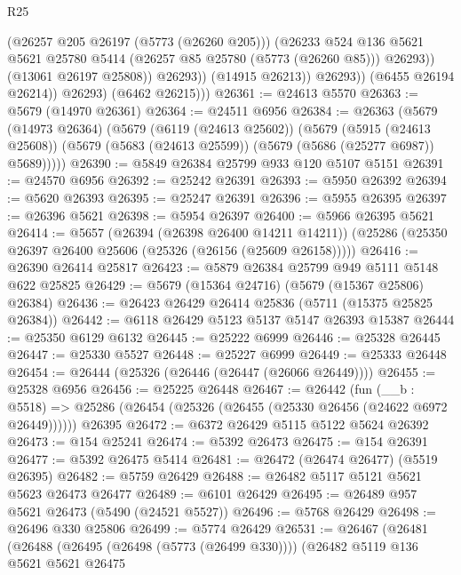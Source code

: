 \begin{lexlean}{R25}
\begin{coremodule}
                          (@26257 @205 @26197 (@5773 (@26260 @205)))
                          (@26233
                            @524
                            @136
                            @5621
                            @5621
                            @25780
                            @5414
                            (@26257 @85 @25780 (@5773 (@26260 @85)))
                            @26293))
                        (@13061 @26197 @25808))
                      @26293))
                  (@14915 @26213))
                @26293))
            (@6455 @26194 @26214))
          @26293)
        (@6462 @26215)))
@26361 := @24613 @5570
@26363 := @5679 (@14970 @26361)
@26364 := @24511 @6956
@26384 := @26363
    (@5679
      (@14973 @26364)
      (@5679
        (@6119 (@24613 @25602))
        (@5679
          (@5915 (@24613 @25608))
          (@5679 (@5683 (@24613 @25599)) (@5679 (@5686 (@25277 @6987)) @5689)))))
@26390 := @5849 @26384 @25799 @933 @120 @5107 @5151
@26391 := @24570 @6956
@26392 := @25242 @26391
@26393 := @5950 @26392
@26394 := @5620 @26393
@26395 := @25247 @26391
@26396 := @5955 @26395
@26397 := @26396 @5621
@26398 := @5954 @26397
@26400 := @5966 @26395 @5621
@26414 := @5657
    (@26394 (@26398 @26400 @14211 @14211))
    (@25286 (@25350 @26397 @26400 @25606 (@25326 (@26156 (@25609 @26158)))))
@26416 := @26390 @26414 @25817
@26423 := @5879 @26384 @25799 @949 @5111 @5148 @622 @25825
@26429 := @5679 (@15364 @24716) (@5679 (@15367 @25806) @26384)
@26436 := @26423 @26429 @26414 @25836 (@5711 (@15375 @25825 @26384))
@26442 := @6118 @26429 @5123 @5137 @5147 @26393 @15387
@26444 := @25350 @6129 @6132
@26445 := @25222 @6999
@26446 := @25328 @26445
@26447 := @25330 @5527
@26448 := @25227 @6999
@26449 := @25333 @26448
@26454 := @26444 (@25326 (@26446 (@26447 (@26066 @26449))))
@26455 := @25328 @6956
@26456 := @25225 @26448
@26467 := @26442
    (fun (__b : @5518) => @25286 (@26454 (@25326 (@26455 (@25330 @26456 (@24622 @6972 @26449))))))
    @26395
@26472 := @6372 @26429 @5115 @5122 @5624 @26392
@26473 := @154 @25241
@26474 := @5392 @26473
@26475 := @154 @26391
@26477 := @5392 @26475 @5414
@26481 := @26472 (@26474 @26477) (@5519 @26395)
@26482 := @5759 @26429
@26488 := @26482 @5117 @5121 @5621 @5623 @26473 @26477
@26489 := @6101 @26429
@26495 := @26489 @957 @5621 @26473 (@5490 (@24521 @5527))
@26496 := @5768 @26429
@26498 := @26496 @330 @25806
@26499 := @5774 @26429
@26531 := @26467
    (@26481
      (@26488
        (@26495 (@26498 (@5773 (@26499 @330))))
        (@26482
          @5119
          @136
          @5621
          @5621
          @26475

\end{coremodule}
\end{lexlean}

